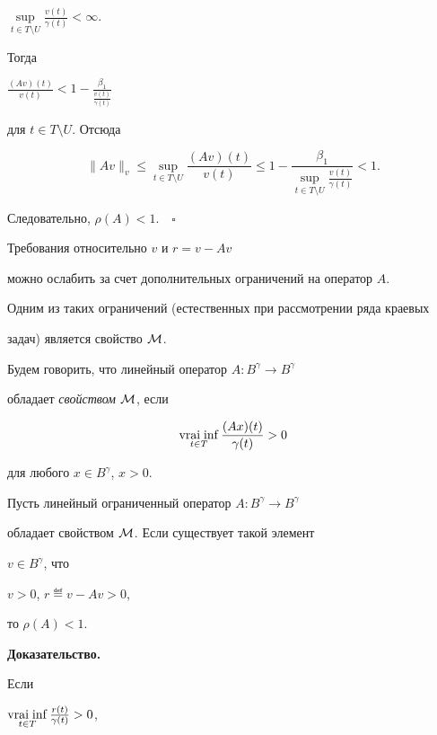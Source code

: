 $\sup\limits_{t\in T\setminus U}\frac{v(t)}{\gamma(t)} <\infty$.


Тогда


$\frac{(Av)(t)}{v(t)} < 1- \frac{\beta_1}{\frac{v(t)}{\gamma(t)}}$


для $t\in T\setminus U$. Отсюда


$$


\|Av\|_v \leq \sup_{t\in T\setminus U} \frac{(Av)(t)}{v(t)} \leq


1 - \frac{\beta_1}{\sup\limits_{t\in T\setminus U}\frac{v(t)}{\gamma(t)}}<1.


$$


Следовательно, $\rho(A)<1.\quad\square$





Требования относительно $v$ и $r=v-Av$


можно ослабить за счет дополнительных ограничений на оператор $A$.


Одним из таких ограничений (естественных при рассмотрении ряда краевых


задач) является свойство $\cal M$.





Будем говорить, что линейный оператор $A:B^\gamma\to B^\gamma$


обладает {\it свойством} $\cal M$, если


$$


\vraiinf_{t\in T} \frac{(Ax)(t)}{\gamma(t)} >0


$$


для любого $x\in B^\gamma$, $x>0$.





\begin{thm}


Пусть линейный ограниченный оператор $A:B^\gamma\to B^\gamma$


обладает свойством $\cal M$. Если существует такой элемент


$v\in B^\gamma$, что


$v>0$, $r\eqdef v-Av >0$,


то $\rho(A)<1$.


\end{thm}





{\bf Доказательство.}


Если


$\vraiinf\limits_{t\in T} \frac{r(t)}{\gamma(t)} >0$,


